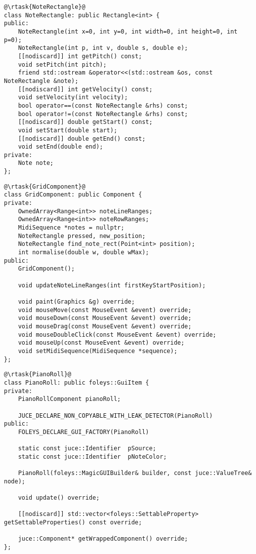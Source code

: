 \begin{verbatim}
@\rtask{NoteRectangle}@
class NoteRectangle: public Rectangle<int> {
public:
    NoteRectangle(int x=0, int y=0, int width=0, int height=0, int p=0);
    NoteRectangle(int p, int v, double s, double e);
    [[nodiscard]] int getPitch() const;
    void setPitch(int pitch);
    friend std::ostream &operator<<(std::ostream &os, const NoteRectangle &note);
    [[nodiscard]] int getVelocity() const;
    void setVelocity(int velocity);
    bool operator==(const NoteRectangle &rhs) const;
    bool operator!=(const NoteRectangle &rhs) const;
    [[nodiscard]] double getStart() const;
    void setStart(double start);
    [[nodiscard]] double getEnd() const;
    void setEnd(double end);
private:
    Note note;
};
\end{verbatim}

\begin{verbatim}
@\rtask{GridComponent}@
class GridComponent: public Component {
private:
    OwnedArray<Range<int>> noteLineRanges;
    OwnedArray<Range<int>> noteRowRanges;
    MidiSequence *notes = nullptr;
    NoteRectangle pressed, new_position;
    NoteRectangle find_note_rect(Point<int> position);
    int normalise(double w, double wMax);
public:
    GridComponent();

    void updateNoteLineRanges(int firstKeyStartPosition);

    void paint(Graphics &g) override;
    void mouseMove(const MouseEvent &event) override;
    void mouseDown(const MouseEvent &event) override;
    void mouseDrag(const MouseEvent &event) override;
    void mouseDoubleClick(const MouseEvent &event) override;
    void mouseUp(const MouseEvent &event) override;
    void setMidiSequence(MidiSequence *sequence);
};
\end{verbatim}

\begin{verbatim}
@\rtask{PianoRoll}@
class PianoRoll: public foleys::GuiItem {
private:
    PianoRollComponent pianoRoll;

    JUCE_DECLARE_NON_COPYABLE_WITH_LEAK_DETECTOR(PianoRoll)
public:
    FOLEYS_DECLARE_GUI_FACTORY(PianoRoll)

    static const juce::Identifier  pSource;
    static const juce::Identifier  pNoteColor;

    PianoRoll(foleys::MagicGUIBuilder& builder, const juce::ValueTree& node);

    void update() override;

    [[nodiscard]] std::vector<foleys::SettableProperty> getSettableProperties() const override;

    juce::Component* getWrappedComponent() override;
};
\end{verbatim}

